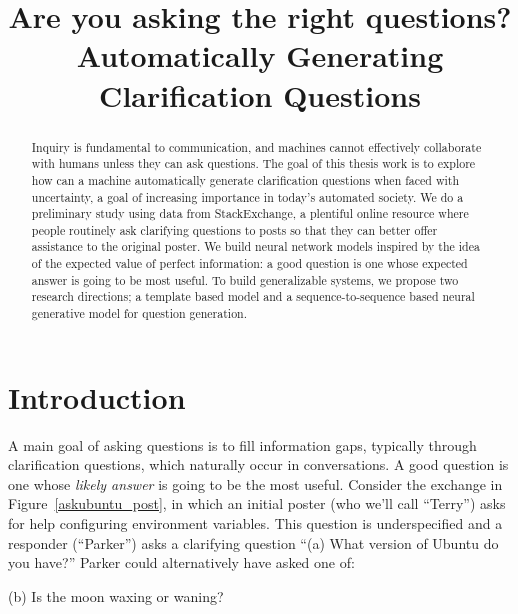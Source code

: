 \documentclass[11pt,a4paper]{article}
\title{Are you asking the right questions? \\ Automatically Generating Clarification Questions}
\date{}
\begin{document}
\maketitle
\begin{abstract}
	
Inquiry is fundamental to communication, and machines cannot effectively collaborate with humans unless they can ask questions. The goal of this thesis work is to explore how can a machine automatically generate clarification questions when faced with uncertainty, a goal of increasing importance in today's automated society. We do a preliminary study using data from StackExchange, a plentiful online resource where people routinely ask clarifying questions to posts so that they can better offer assistance to the original poster. We build neural network models inspired by the idea of the expected value of perfect information: a good question is one whose expected answer is going to be most useful.
To build generalizable systems, we propose two research directions; a template based model and a sequence-to-sequence based neural generative model for question generation.
\end{abstract}

\section{Introduction}\label{introduction}

A main goal of asking questions is to fill information gaps, typically through clarification questions, which naturally occur in conversations. 
A good question is one whose \emph{likely answer} is going to be the most useful.
Consider the exchange in Figure~\ref{askubuntu_post}, in which an initial poster (who we'll call ``Terry'') asks for help configuring environment variables.
This question is underspecified and a responder (``Parker'') asks a clarifying question ``\textsf{\small (a) What version of Ubuntu do you have?}''
Parker could alternatively have asked one of:

\textsf{\small(b) Is the moon waxing or waning?}
\end{document}
